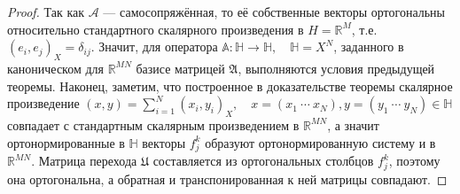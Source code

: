  \begin{proof}
     Так как \( \mathcal{A} \) --- самосопряжённая,
     то её собственные векторы ортогональны относительно стандартного скалярного произведения в \( H=\mathbb{R}^M \),
     т.е. \( (e_i, e_j)_X = \delta_{ij} \).
     Значит, для оператора \( \mathbb{A}:\mathbb{H}\to\mathbb{H}, \quad \mathbb{H}=X^N \),
     заданного в каноническом для \( \mathbb{R}^{MN} \) базисе матрицей \( \mathfrak{A} \),
     выполняются условия предыдущей теоремы.
     Наконец, заметим, что построенное в доказательстве теоремы
     скалярное произведение \( (x,y) = \sum_{i=1}^N (x_i, y_i)_X, \quad x=(x_1~\cdots~x_N),y=(y_1~\cdots~y_N)\in\mathbb{H} \)
     совпадает с стандартным скалярным произведением в \( \mathbb{R}^{MN} \),
     а значит ортонормированные в \( \mathbb{H} \) векторы \( f_j^k \)
     образуют ортонормированную систему и в \( \mathbb{R}^{MN} \).
     Матрица перехода \( \mathfrak{U} \) составляется из ортогональных столбцов \( f_j^k \),
     поэтому она ортогональна, а обратная и транспонированная к ней матрицы совпадают.
 \end{proof}

